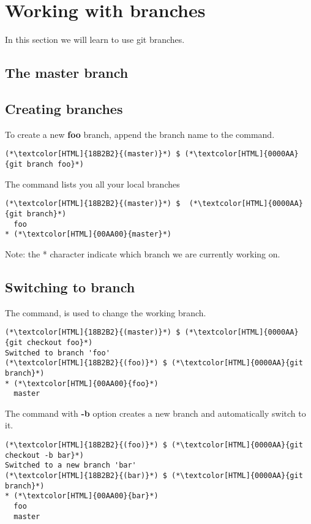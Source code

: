 \section{Working with branches}
\begin{frame}[fragile]
    \slidetitle
In this section we will learn to use git branches.
\end{frame}

\subsection{The master branch}
\begin{frame}[fragile]
    \subslidetitle
\end{frame}

\subsection{Creating branches}
\begin{frame}[fragile]
    \subslidetitle

To create a new \textbf{foo} branch, append the branch name to the  command.
\begin{lstlisting}
(*\textcolor[HTML]{18B2B2}{(master)}*) $ (*\textcolor[HTML]{0000AA}{git branch foo}*)
\end{lstlisting}

The  command lists you all your local branches
\begin{lstlisting}
(*\textcolor[HTML]{18B2B2}{(master)}*) $  (*\textcolor[HTML]{0000AA}{git branch}*)
  foo
* (*\textcolor[HTML]{00AA00}{master}*)
\end{lstlisting}

Note: the * character indicate which branch we are currently working on.
\end{frame}

\subsection{Switching to branch}
\begin{frame}[fragile]
    \subslidetitle
The  command, is used to change the working branch.
\begin{lstlisting}
(*\textcolor[HTML]{18B2B2}{(master)}*) $ (*\textcolor[HTML]{0000AA}{git checkout foo}*)
Switched to branch 'foo'
(*\textcolor[HTML]{18B2B2}{(foo)}*) $ (*\textcolor[HTML]{0000AA}{git branch}*)
* (*\textcolor[HTML]{00AA00}{foo}*)
  master
\end{lstlisting}

The  command with \textbf{-b} option creates a new branch and automatically switch to it.
\begin{lstlisting}
(*\textcolor[HTML]{18B2B2}{(foo)}*) $ (*\textcolor[HTML]{0000AA}{git checkout -b bar}*)
Switched to a new branch 'bar'
(*\textcolor[HTML]{18B2B2}{(bar)}*) $ (*\textcolor[HTML]{0000AA}{git branch}*)
* (*\textcolor[HTML]{00AA00}{bar}*)
  foo
  master
\end{lstlisting}
\end{frame}

